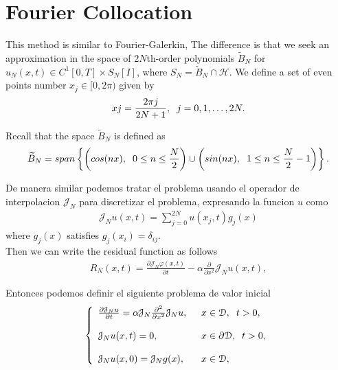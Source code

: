 	\section{Fourier Collocation}
	
	This method is similar to Fourier-Galerkin, The difference is that we seek an approximation in the space of $2N$th-order polynomials $\widetilde{B}_N$ for $u_N (x, t) \in C^1 [0, T] \times S_N [I]$, where $S_N = \widetilde{B}_N \cap \mathcal{H}$. We define a set of even points number $x_j \in [0, 2 \pi)$ given by
	\begin{align*}
		xj = \frac{2 \pi j}{2N + 1}, \hspace{2mm} j = 0, 1, \dots, 2N.
	\end{align*}
	
	Recall that the space $\widetilde{B}_N$ is defined as
	\begin{align*}
		\widetilde{B}_N = span\left\{\left(cos(nx), \hspace{0.2cm} 0 \leq n \leq \frac{N}{2} \right)\cup  \left(sin(nx), \hspace{0.2cm} 1 \leq n \leq \frac{N}{2} - 1 \right)\right\}.
	\end{align*} 
	
	De manera similar podemos tratar el problema usando el operador de interpolacion $\mathcal{J}_N$ para discretizar el problema, expresando la funcion $u$ como
	\begin{align*}
		\mathcal{J}_N u (x, t) =  \displaystyle \sum_{j=0}^{2N} u (x_j, t) g_j (x)
	\end{align*}
	where $g_j (x)$ satisfies $g_j(x_i) = \delta_{ij}$. \\
	
	Then we can write the residual function as follows 
	\begin{align*}
		R_N (x, t) = \frac{\partial \mathcal{J}_N \varphi (x, t)}{\partial t} - \alpha \frac{\partial}{\partial x^2} \mathcal{J}_N u(x, t),
	\end{align*}

	Entonces podemos definir el siguiente problema de valor inicial
	\begin{align}
		\label{DISCRET2_IVP_LINEAR}	
		\left \lbrace \begin{array}{ll}
			\frac{\partial \mathcal{J}_N u}{\partial t} = \alpha \mathcal{J}_N \frac{\partial^2}{\partial x^2} \mathcal{J}_N u, \hspace{2mm} &x \in \mathcal{D}, \hspace{2mm} t > 0,\\
			\\
			\mathcal{J}_N u (x, t) = 0, &x \in \partial \mathcal{D}, \hspace{2mm} t > 0, \\
			\\
			\mathcal{J}_N u(x, 0) = \mathcal{J}_N g (x), &x \in \mathcal{D},
		\end{array}  \right .
	\end{align}
	
